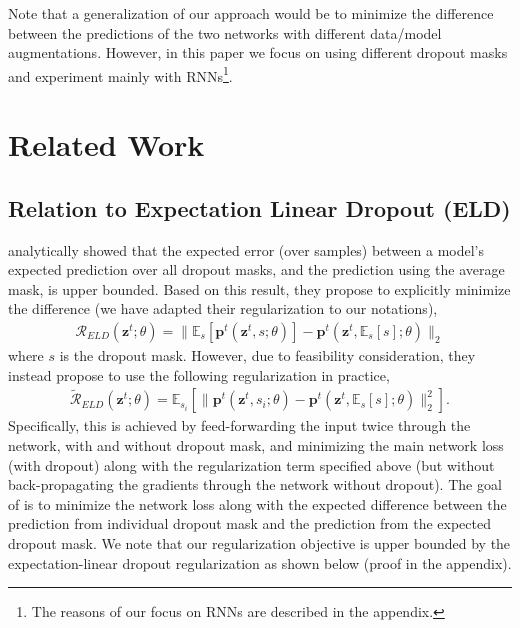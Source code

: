 \documentclass{article} %
\begin{document}
Note that a generalization of our approach would be to minimize the difference between the predictions of the two networks with different data/model augmentations. However, in this paper we focus on using different dropout masks and experiment mainly with RNNs\footnote{The reasons of our focus on RNNs are described in the appendix.}.

\section{Related Work}

\subsection{Relation to Expectation Linear Dropout (ELD)}

\citet{ma2016dropout} analytically showed that the expected error (over samples) between a model's expected prediction over all dropout masks, and the prediction using the average mask, is upper bounded. Based on this result, they propose to explicitly minimize the difference (we have adapted their regularization to our notations),
\begin{align}
\mathcal{R}_{ELD}(\mathbf{z}^{t}; \theta) = \lVert \mathbb{E}_{s} \left[ \mathbf{p}^t(\mathbf{z}^{t}, s; \theta) \right] - \mathbf{p}^t(\mathbf{z}^{t}, \mathbb{E}_{s}[{s}]; \theta) \rVert_2 
\end{align}
where $s$ is the dropout mask. However, due to feasibility consideration, they instead propose to use the following regularization in practice,
\begin{align}
\mathcal{\tilde{R}}_{ELD}(\mathbf{z}^{t}; \theta) = \mathbb{E}_{s_i} \left[ \lVert   \mathbf{p}^t(\mathbf{z}^{t}, s_i; \theta) - \mathbf{p}^t(\mathbf{z}^{t}, \mathbb{E}_{s}[{s}]; \theta) \rVert_2^2   \right].
\end{align}
Specifically, this is achieved by feed-forwarding the input twice through the network, with and without dropout mask, and minimizing the main network loss (with dropout) along with the regularization term specified above (but without back-propagating the gradients through the network without dropout). The goal of \citet{ma2016dropout} is to minimize the network loss along with the expected difference between the prediction from individual dropout mask and the prediction from the expected dropout mask. We note that our regularization objective is upper bounded by the expectation-linear dropout regularization as shown below (proof in the appendix).
\end{document}
